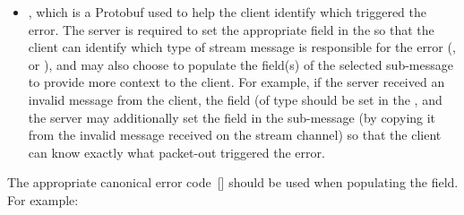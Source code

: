 \documentclass[11pt]{article}
\begin{document}
{\begin{itemize}[noitemsep,topsep=\mdcompacttopsep]
\item{}, which is a Protobuf  used to help the client identify which
 triggered the error. The server is required to set the
appropriate field in the  so that the client can identify which type
of stream message is responsible for the error (,
 or ), and may also choose to populate the field(s)
of the selected sub-message to provide more context to the client. For
example, if the server received an invalid  message from the
client, the  field (of type  should be set in
the  , and the server may additionally set the 
field in the  sub-message (by copying it from the invalid
 message received on the stream channel) so that the client can
know exactly what packet-out triggered the error.%
\end{itemize}%

\noindent{}The appropriate canonical error code~[] should be used when
populating the  field. For example:%

}
\end{document}
